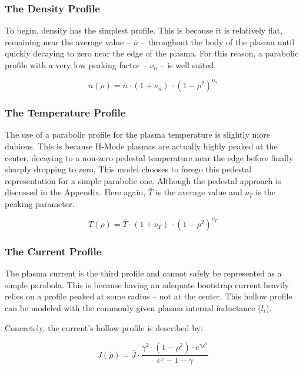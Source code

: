 \subsubsection{The Density Profile}

To begin, density has the simplest profile. This is because it is relatively flat, remaining near the average value -- $\overline n$ -- throughout the body of the plasma until quickly decaying to zero near the edge of the plasma. For this reason, a parabolic profile with a very low peaking factor -- $\nu_n$ -- is well suited.

\begin{equation}
	n(\rho) = \overline n \cdot ( 1 + \nu_n ) \, \cdot ( 1 - \rho ^ 2 ) ^ {\nu_n}
\end{equation}

\subsubsection{The Temperature Profile}

The use of a parabolic profile for the plasma temperature is slightly more dubious. This is because H-Mode plasmas are actually highly peaked at the center, decaying to a non-zero pedestal temperature near the edge before finally sharply dropping to zero. This model chooses to forego this pedestal representation for a simple parabolic one. Although the pedestal approach is discussed in the Appendix. Here again, $\overline T$ is the average value and $\nu_T$ is the peaking parameter.

\begin{equation}
	T(\rho) = \overline T \cdot ( 1 + \nu_T ) \, \cdot ( 1 - \rho ^ 2 ) ^ {\nu_T}
\end{equation}

\subsubsection{The Current Profile}

The plasma current is the third profile and cannot safely be represented as a simple parabola. This is because having an adequate bootstrap current heavily relies on a profile peaked at some radius -- not at the center. This hollow profile can be modeled with the commonly given plasma internal inductance ($l_i$).

Concretely, the current's hollow profile is described by:

\begin{equation}
	J(\rho) = \bar{J} \cdot \frac{ \gamma ^ 2 \cdot ( 1 - \rho ^ 2 ) \cdot e^{ \gamma \rho^2 } }{ e^\gamma - 1 - \gamma}
\end{equation}

